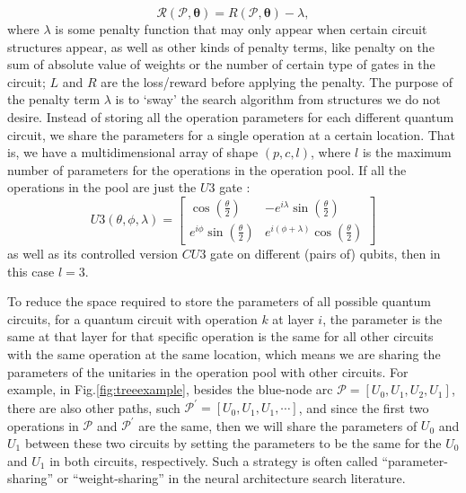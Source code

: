 \documentclass[a4paper,onecolumn,11pt]{quantumarticle}
\begin{document}
\begin{equation}
    \mathcal{R}(\mathcal{P},\boldsymbol{\theta})=R(\mathcal{P}, \boldsymbol{\theta})-\lambda,
\end{equation}
where $\lambda$ is some penalty function that may only appear when certain circuit structures appear, as well as other kinds of penalty terms, like penalty on the sum of absolute value of weights or the number of certain type of gates in the circuit; $L$ and $R$ are the loss/reward before applying the penalty. The purpose of the penalty term $\lambda$ is to `sway' the search algorithm from structures we do not desire.
Instead of storing all the operation parameters for each different quantum circuit, we share the parameters for a single operation at a certain location. That is, we have a multidimensional array of shape $(p, c, l)$, where $l$ is the maximum number of parameters for the operations in the operation pool. If all the operations in the pool are just the $U3$ gate \cite{nielsen00}:
\begin{equation}
U 3(\theta, \phi, \lambda)=\left[\begin{array}{cc}
\cos \left(\frac{\theta}{2}\right) & -e^{i \lambda} \sin \left(\frac{\theta}{2}\right) \\
e^{i \phi} \sin \left(\frac{\theta}{2}\right) & e^{i(\phi+\lambda)} \cos \left(\frac{\theta}{2}\right)
\end{array}\right]
\end{equation}
as well as its controlled version $CU3$ gate on different (pairs of) qubits, then in this case $l=3$.

To reduce the space required to store the parameters of all possible quantum circuits, for a quantum circuit with operation $k$ at layer $i$, the parameter is the same at that layer for that specific operation is the same for all other circuits with the same operation at the same location, which means we are sharing the parameters of the unitaries in the operation pool with other circuits. For example, in Fig.\ref{fig:treeexample}, besides the blue-node arc $\mathcal{P}=[U_0, U_1, U_2, U_1]$, there are also other paths, such $\mathcal{P}^{'} = [U_0, U_1, U_1, \cdots]$, and since the first two operations in $\mathcal{P}$ and $\mathcal{P}^{'}$ are the same, then we will share the parameters of $U_0$ and $U_1$ between these two circuits by setting the parameters to be the same for the $U_0$ and $U_1$ in both circuits, respectively.
Such a strategy is often called ``parameter-sharing'' or ``weight-sharing'' in the neural architecture search literature.
\end{document}
